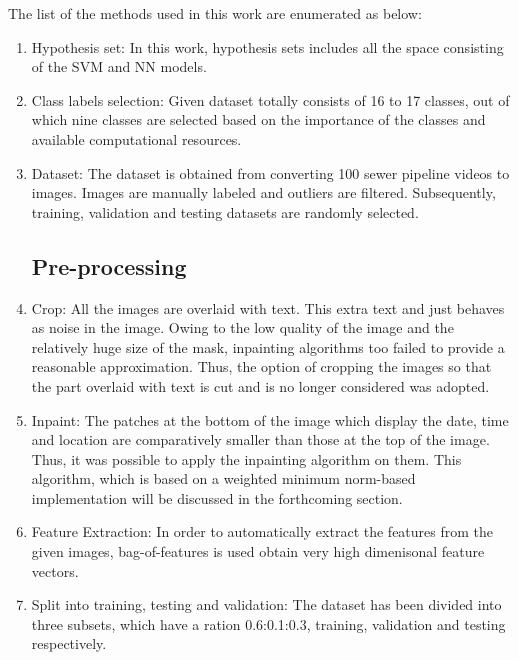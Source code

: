 \documentclass[letterpaper,12pt, onecolumn]{article}%
\begin{document}
The list of the methods used in this work are enumerated as below:
\begin{enumerate}
\subsection*{Model}
  \item Hypothesis set: In this work, hypothesis sets includes all the space consisting of the SVM and NN models.
  
  \item Class labels selection: Given dataset totally consists of 16 to 17 classes, out of which nine classes are selected based on the importance of the classes and available computational resources.
  
  \item Dataset:  The dataset is obtained from converting 100 sewer pipeline videos to images. Images are manually labeled and outliers are filtered. Subsequently, training, validation and testing datasets are randomly selected.
  
  \subsection*{Pre-processing}
  \item Crop: All the images are overlaid with text. This extra text and just behaves as noise in the image. Owing to the low quality of the image and the relatively huge size of the mask, inpainting algorithms too failed to provide a reasonable approximation. Thus, the option of cropping the images so that the part overlaid with text is cut and is no longer considered was adopted. 
  
  \item Inpaint: The patches at the bottom of the image which display the date, time and location are comparatively smaller than those at the top of the image. Thus, it was possible to apply the inpainting algorithm on them. This algorithm, which is based on a weighted minimum norm-based implementation will be discussed in the forthcoming section.
  
  \item Feature Extraction: In order to automatically extract the features from the given images, bag-of-features \citep{csurka2004visual} is used obtain very high dimenisonal feature vectors.
  
  \item Split into training, testing and validation: The dataset has been divided into three subsets, which have a ration 0.6:0.1:0.3, training, validation and testing respectively.
  

\end{enumerate}
\end{document}
